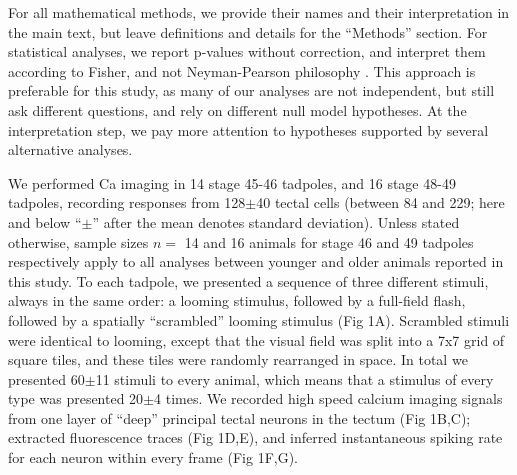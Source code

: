 \documentclass{article}
\begin{document}
For all mathematical methods, we provide their names and their interpretation in the main text, but leave definitions and details for the “Methods” section. For statistical analyses, we report p-values without correction, and interpret them according to Fisher, and not Neyman-Pearson philosophy \citep{greenland2016}. This approach is preferable for this study, as many of our analyses are not independent, but still ask different questions, and rely on different null model hypotheses. At the interpretation step, we pay more attention to hypotheses supported by several alternative analyses.

We performed Ca imaging in 14 stage 45-46 tadpoles, and 16 stage 48-49 tadpoles, recording responses from 128$\pm$40 tectal cells (between 84 and 229; here and below “$\pm$” after the mean denotes standard deviation). Unless stated otherwise, sample sizes $n=$ 14 and 16 animals for stage 46 and 49 tadpoles respectively apply to all analyses between younger and older animals reported in this study. To each tadpole, we presented a sequence of three different stimuli, always in the same order: a looming stimulus, followed by a full-field flash, followed by a spatially “scrambled” looming stimulus (Fig 1A). Scrambled stimuli were identical to looming, except that the visual field was split into a 7x7 grid of square tiles, and these tiles were randomly rearranged in space. In total we presented 60$\pm$11 stimuli to every animal, which means that a stimulus of every type was presented 20$\pm$4 times. We recorded high speed calcium imaging signals \citep{xu2011,truszkowski2017} from one layer of “deep” principal tectal neurons in the tectum (Fig 1B,C); extracted fluorescence traces (Fig 1D,E), and inferred instantaneous spiking rate for each neuron within every frame (Fig 1F,G).
\end{document}
